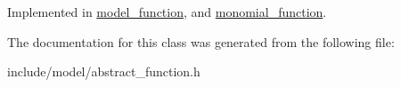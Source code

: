 Implemented in \hyperlink{classmodel__function_adf3a7a6ff204c7e993f63f61cd2cfcf1}{model\-\_\-function}, and \hyperlink{classmonomial__function_a1bb8949943f068e0597c7a8983011d12}{monomial\-\_\-function}.



The documentation for this class was generated from the following file\-:\begin{DoxyCompactItemize}
\item 
include/model/abstract\-\_\-function.\-h\end{DoxyCompactItemize}
